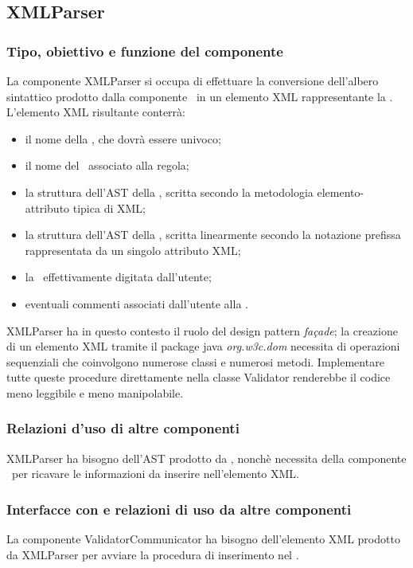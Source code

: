 \documentclass[11pt,titlepage,a4paper]{report}
\begin{document}
\subsection{XMLParser}%
\subsubsection{Tipo, obiettivo e funzione del componente}
La componente XMLParser si occupa di effettuare la conversione dell'albero sintattico prodotto dalla componente \brp\ in un elemento XML rappresentante la \br. L'elemento XML risultante conterr\`a:
\begin{itemize}
 \item il nome della \br, che dovr\`a essere univoco;
 \item il nome del \bo\ associato alla regola;
 \item la struttura dell'AST della \br, scritta secondo la metodologia elemento-attributo tipica di XML;
 \item la struttura dell'AST della \br, scritta linearmente secondo la notazione prefissa rappresentata da un singolo attributo XML;
 \item la \br\ effettivamente digitata dall'utente;
 \item eventuali commenti associati dall'utente alla \br.
\end{itemize}
XMLParser ha in questo contesto il ruolo del design pattern \textit{fa\c{c}ade}; la creazione di un elemento XML tramite il package java \textit{org.w3c.dom} necessita di operazioni sequenziali che coinvolgono numerose classi e numerosi metodi. Implementare tutte queste procedure direttamente nella classe Validator renderebbe il codice meno leggibile e meno manipolabile.
\subsubsection{Relazioni d'uso di altre componenti}
XMLParser ha bisogno dell'AST prodotto da \brp, nonch\`e necessita della componente \br\ per ricavare le informazioni da inserire nell'elemento XML.
\subsubsection{Interfacce con e relazioni di uso da altre componenti}
La componente ValidatorCommunicator ha bisogno dell'elemento XML prodotto da XMLParser per avviare la procedura di inserimento nel \re.
\end{document}

